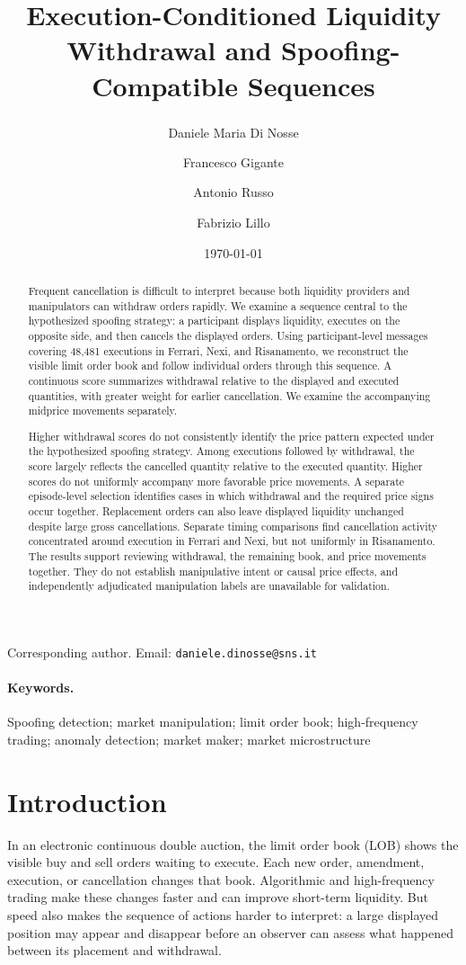 \documentclass[11pt]{article}
\title{Execution-Conditioned Liquidity Withdrawal and Spoofing-Compatible Sequences}
\author[1]{Daniele Maria Di Nosse\textsuperscript{\dag}}
\author[2]{Francesco Gigante}
\author[2]{Antonio Russo}
\author[1]{Fabrizio Lillo}
\affil[1]{Scuola Normale Superiore, Pisa, Italy}
\affil[2]{Consob, Rome, Italy}
\date{\today}
\begin{document}
\maketitle
\begin{center}
  \footnotesize
  \dag Corresponding author. Email: \texttt{daniele.dinosse@sns.it}
\end{center}

\begin{abstract}
Frequent cancellation is difficult to interpret because both liquidity providers and manipulators can withdraw orders rapidly. We examine a sequence central to the hypothesized spoofing strategy: a participant displays liquidity, executes on the opposite side, and then cancels the displayed orders. Using participant-level messages covering 48,481 executions in Ferrari, Nexi, and Risanamento, we reconstruct the visible limit order book and follow individual orders through this sequence. A continuous score summarizes withdrawal relative to the displayed and executed quantities, with greater weight for earlier cancellation. We examine the accompanying midprice movements separately.

Higher withdrawal scores do not consistently identify the price pattern expected under the hypothesized spoofing strategy. Among executions followed by withdrawal, the score largely reflects the cancelled quantity relative to the executed quantity. Higher scores do not uniformly accompany more favorable price movements. A separate episode-level selection identifies cases in which withdrawal and the required price signs occur together. Replacement orders can also leave displayed liquidity unchanged despite large gross cancellations. Separate timing comparisons find cancellation activity concentrated around execution in Ferrari and Nexi, but not uniformly in Risanamento. The results support reviewing withdrawal, the remaining book, and price movements together. They do not establish manipulative intent or causal price effects, and independently adjudicated manipulation labels are unavailable for validation.
\end{abstract}

\paragraph{Keywords.}
Spoofing detection; market manipulation; limit order book; high-frequency trading; anomaly detection; market maker; market microstructure

\section{Introduction}
\label{sec:introduction}
In an electronic continuous double auction, the limit order book (LOB) shows the visible buy and sell orders waiting to execute. Each new order, amendment, execution, or cancellation changes that book. Algorithmic and high-frequency trading make these changes faster and can improve short-term liquidity. But speed also makes the sequence of actions harder to interpret: a large displayed position may appear and disappear before an observer can assess what happened between its placement and withdrawal.
\end{document}
